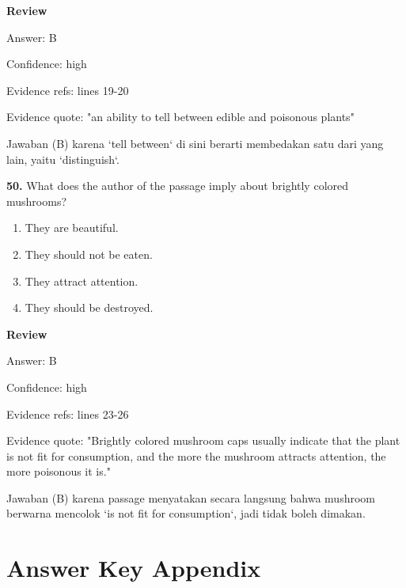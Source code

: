 \documentclass[12pt]{article}
\begin{document}
\textbf{Review}\par
Answer: B\par
Confidence: high\par
Evidence refs: lines 19-20\par
Evidence quote: "an ability to tell between edible and poisonous plants"\par
Jawaban (B) karena `tell between` di sini berarti membedakan satu dari yang lain, yaitu `distinguish`.\par
\endgroup
\par
\vspace{0.25\baselineskip}
\noindent\textbf{50.} What does the author of the passage imply about brightly colored mushrooms?
\begin{enumerate}[label=(\Alph*),leftmargin=*,itemsep=0.2em]
\item They are beautiful.
\item They should not be eaten.
\item They attract attention.
\item They should be destroyed.
\end{enumerate}
\par
\begingroup
\setlength{\parskip}{0pt}
\setlength{\parindent}{0pt}
\textbf{Review}\par
Answer: B\par
Confidence: high\par
Evidence refs: lines 23-26\par
Evidence quote: "Brightly colored mushroom caps usually indicate that the plant is not fit for consumption, and the more the mushroom attracts attention, the more poisonous it is."\par
Jawaban (B) karena passage menyatakan secara langsung bahwa mushroom berwarna mencolok `is not fit for consumption`, jadi tidak boleh dimakan.\par
\endgroup
\par
\vspace{0.25\baselineskip}
\newpage
\section*{Answer Key Appendix}
\end{document}
